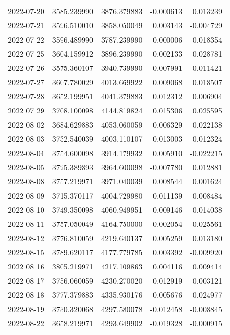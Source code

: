 \begin{tabular}{lrrrr}
2022-07-20 & 3585.239990 & 3876.379883 &       -0.000613 &     0.013239 \\
2022-07-21 & 3596.510010 & 3858.050049 &        0.003143 &    -0.004729 \\
2022-07-22 & 3596.489990 & 3787.239990 &       -0.000006 &    -0.018354 \\
2022-07-25 & 3604.159912 & 3896.239990 &        0.002133 &     0.028781 \\
2022-07-26 & 3575.360107 & 3940.739990 &       -0.007991 &     0.011421 \\
2022-07-27 & 3607.780029 & 4013.669922 &        0.009068 &     0.018507 \\
2022-07-28 & 3652.199951 & 4041.379883 &        0.012312 &     0.006904 \\
2022-07-29 & 3708.100098 & 4144.819824 &        0.015306 &     0.025595 \\
2022-08-02 & 3684.629883 & 4053.060059 &       -0.006329 &    -0.022138 \\
2022-08-03 & 3732.540039 & 4003.110107 &        0.013003 &    -0.012324 \\
2022-08-04 & 3754.600098 & 3914.179932 &        0.005910 &    -0.022215 \\
2022-08-05 & 3725.389893 & 3964.600098 &       -0.007780 &     0.012881 \\
2022-08-08 & 3757.219971 & 3971.040039 &        0.008544 &     0.001624 \\
2022-08-09 & 3715.370117 & 4004.729980 &       -0.011139 &     0.008484 \\
2022-08-10 & 3749.350098 & 4060.949951 &        0.009146 &     0.014038 \\
2022-08-11 & 3757.050049 & 4164.750000 &        0.002054 &     0.025561 \\
2022-08-12 & 3776.810059 & 4219.640137 &        0.005259 &     0.013180 \\
2022-08-15 & 3789.620117 & 4177.779785 &        0.003392 &    -0.009920 \\
2022-08-16 & 3805.219971 & 4217.109863 &        0.004116 &     0.009414 \\
2022-08-17 & 3756.060059 & 4230.270020 &       -0.012919 &     0.003121 \\
2022-08-18 & 3777.379883 & 4335.930176 &        0.005676 &     0.024977 \\
2022-08-19 & 3730.320068 & 4297.580078 &       -0.012458 &    -0.008845 \\
2022-08-22 & 3658.219971 & 4293.649902 &       -0.019328 &    -0.000915 \\

\end{tabular}

